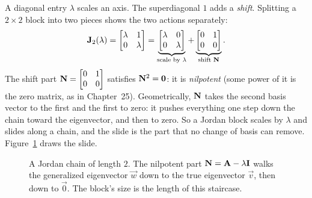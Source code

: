 A diagonal entry $\lambda$ scales an axis. The superdiagonal $1$ adds a \emph{shift}.
Splitting a $2\times 2$ block into two pieces shows the two actions separately:
\[
\mathbf{J}_2(\lambda)=\begin{bmatrix}\lambda&1\\0&\lambda\end{bmatrix}
=\underbrace{\begin{bmatrix}\lambda&0\\0&\lambda\end{bmatrix}}_{\text{scale by }\lambda}
+\underbrace{\begin{bmatrix}0&1\\0&0\end{bmatrix}}_{\text{shift }\mathbf{N}}.
\]
The shift part $\mathbf{N}=\begin{bmatrix}0&1\\0&0\end{bmatrix}$ satisfies $\mathbf{N}^2=\mathbf{0}$:
it is \emph{nilpotent} (some power of it is the zero matrix, as in Chapter~25).
Geometrically, $\mathbf{N}$ takes the second basis vector to the first and the first to
zero: it pushes everything one step down the chain toward the eigenvector, and then to
zero. So a Jordan block scales by $\lambda$ and slides along a chain, and the slide is
the part that no change of basis can remove. Figure~\ref{ch28:chain} draws the slide.

\begin{figure}[H]
\centering
{}
\caption{A Jordan chain of length $2$. The nilpotent part $\mathbf{N}=\mathbf{A}-\lambda\mathbf{I}$
walks the generalized eigenvector $\vec{w}$ down to the true eigenvector $\vec{v}$, then
down to $\vec{0}$. The block's size is the length of this staircase.}
\label{ch28:chain}
\end{figure}

